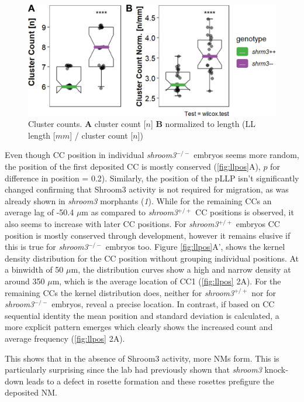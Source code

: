 \documentclass[11pt,singlespacinge,twoside]{reedthesis} %
\theoremstyle{definition}
\theoremstyle{definition}
\theoremstyle{definition}
\theoremstyle{remark}
\begin{document}
\begin{figure}

{\centering \includegraphics[width=0.6\linewidth]{figures/results/01_morphometrics/ll_counts} 

}

\caption[Cluster Counts]{Cluster counts. \textbf{A} cluster count {[}\(n\){]} \textbf{B} normalized to length (LL length {[}\(mm\){]} / cluster count {[}\(n\){]})}\label{fig:llcounts}
\end{figure}
Even though CC position in individual \emph{shroom3}\(^{-/-}\) embryos seems more random, the position of the first deposited CC is mostly conserved (\ref{fig:llpos}A), \(p\) for difference in position = 0.2). Similarly, the position of the pLLP isn't significantly changed confirming that Shroom3 activity is not required for migration, as was already shown in \emph{shroom3} morphants (\emph{1}). While for the remaining CCs an average lag of -50.4 \(\mu\)m as compared to \emph{shroom3}\(^{+/+}\) CC positions is observed, it also seems to increase with later CC positions. For \emph{shroom3}\(^{+/+}\) embryos CC position is mostly conserved through development, however it remains elusive if this is true for \emph{shroom3}\(^{-/-}\) embryos too.
Figure \ref{fig:llpos}A', shows the kernel density distribution for the CC position without grouping individual positions. At a binwidth of 50 \(\mu\)m, the distribution curves show a high and narrow density at around 350 \(\mu\)m, which is the average location of CC1 (\ref{fig:llpos} 2A). For the remaining CCs the kernel distribution does, neither for \emph{shroom3}\(^{+/+}\) nor for \emph{shroom3}\(^{-/-}\) embryos, reveal a precise location. In contrast, if based on CC sequential identity the mean position and standard deviation is calculated, a more explicit pattern emerges which clearly shows the increased count and average frequency (\ref{fig:llpos} 2A).

This shows that in the absence of Shroom3 activity, more NMs form. This is particularly surprising since the lab had previously shown that \emph{shroom3} knock-down leads to a defect in rosette formation and these rosettes prefigure the deposited NM.
\end{document}
